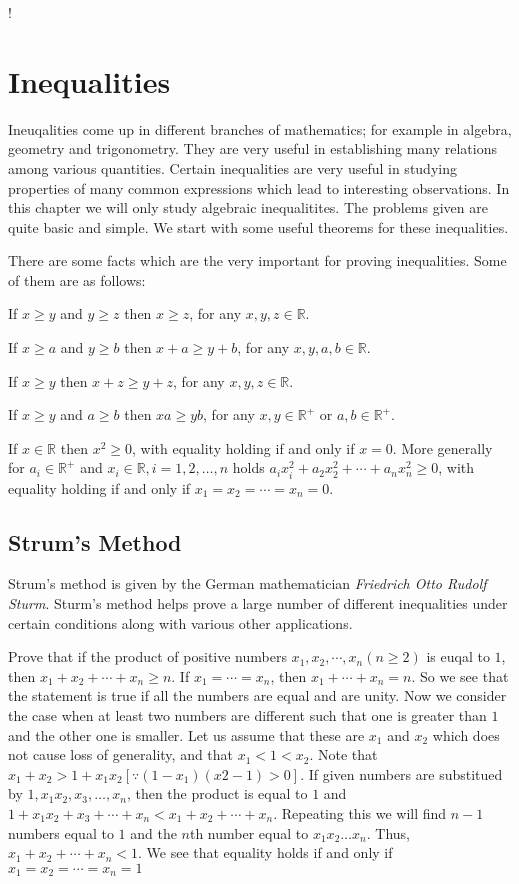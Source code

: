 !\chapter{Inequalities}
Ineuqalities come up in different branches of mathematics; for example in algebra, geometry and trigonometry. They are very
useful in establishing many relations among various quantities. Certain inequalities are very useful in studying properties of
many common expressions which lead to interesting observations. In this chapter we will only study algebraic inequalitites. The
problems given are quite basic and simple. We start with some useful theorems for these inequalities.

There are some facts which are the very important for proving inequalities. Some of them are as follows:

\startitemize[n]
\item If $x\geq y$ and $y\geq z$ then $x\geq z$, for any $x, y, z\in\mathbb{R}$.
\item If $x\geq a$ and $y\geq b$ then $x + a\geq y + b$, for any $x, y, a, b\in\mathbb{R}$.
\item If $x\geq y$ then $x + z\geq y + z$, for any $x, y, z\in\mathbb{R}$.
\item If $x\geq y$ and $a\geq b$ then $xa\geq yb$, for any $x, y\in\mathbb{R}^+$ or $a, b\in\mathbb{R}^+$.
\item If $x\in\mathbb{R}$ then $x^2\geq 0$, with equality holding if and only if $x = 0$. More generally for $a_i\in\mathbb{R}^+$
  and $x_i\in\mathbb{R}, i = 1, 2, \ldots, n$ holds $a_ix_i^2 + a_2x_2^2 + \cdots + a_nx_n^2\geq 0$, with equality holding if and
  only if $x_1 = x_2 = \cdots = x_n = 0$.
\stopitemize

\section{Strum's Method}
Strum's method is given by the German mathematician {\sl Friedrich Otto Rudolf Sturm}. Sturm's method helps prove a large number of
different inequalities under certain conditions along with various other applications.

\starttheorem[th:strum:1]
Prove that if the product of positive numbers $x_1, x_2, \cdots, x_n (n\geq 2)$ is euqal to $1$, then $x_1 + x_2 + \cdots + x_n\geq n$.
\stoptheorem
\startproof
  If $x_1 = \cdots = x_n$, then $x_1 + \cdots + x_n = n$. So we see that the statement is true if all the numbers are equal and are
  unity. Now we consider the case when at least two numbers are different such that one is greater than $1$ and the other one is
  smaller. Let us assume that these are $x_1$ and $x_2$ which does not cause loss of generality, and that $x_1 < 1 < x_2$. Note
  that $x_1 + x_2 > 1 + x_1x_2 [\because (1 - x_1)(x2 - 1) > 0]$. If given numbers are substitued by $1, x_1x_2, x_3, \ldots, x_n$,
  then the product is equal to $1$ and $1 + x_1x_2 + x_3 + \cdots + x_n < x_1 + x_2 + \cdots + x_n$. Repeating this we will find $n
  - 1$ numbers equal to $1$ and the $n$th number equal to $x_1x_2\ldots x_n$. Thus, $x_1 + x_2 + \cdots + x_n < 1$. We see that
  equality holds if and only if $x_1 = x_2 = \cdots = x_n = 1$
\stopproof

